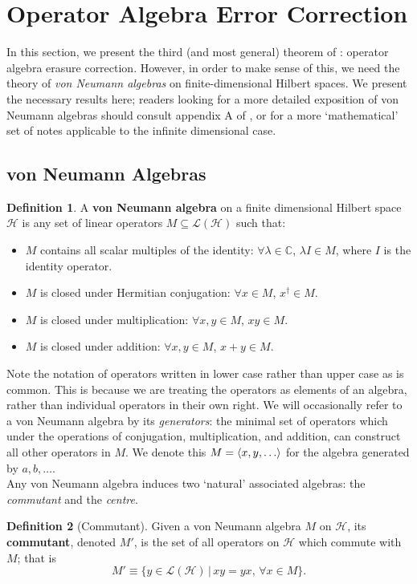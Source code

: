 \documentclass[12pt,a4paper]{report}
\numberwithin{equation}{section}
\theoremstyle{definition}
\newtheorem{definition}{Definition}[section]
\theoremstyle{theorem}
\theoremstyle{theorem}
\theoremstyle{example}
\theoremstyle{definition}
\begin{document}
\section{Operator Algebra Error Correction}
In this section, we present the third (and most general) theorem of \cite{Harlow}: operator algebra erasure correction. However, in order to make sense of this, we need the theory of \textit{von Neumann algebras} on finite-dimensional Hilbert spaces. We present the necessary results here; readers looking for a more detailed exposition of von Neumann algebras should consult appendix A of \cite{Harlow}, or \cite{VNA} for a more `mathematical' set of notes applicable to the infinite dimensional case.
\subsection{von Neumann Algebras}
\begin{definition}
	A \textbf{von Neumann algebra} on a finite dimensional Hilbert space $\mathcal{H}$ is any set of linear operators $M\subseteq\mathcal{L}(\mathcal{H})$ such that:
	\begin{itemize}
		\item $M$ contains all scalar multiples of the identity: $\forall \lambda\in\mathbb{C}$, $\lambda I\in M$, where $I$ is the identity operator.
		\item $M$ is closed under Hermitian conjugation: $\forall x\in M$, $x^{\dagger}\in M$.
		\item $M$ is closed under multiplication: $\forall x,y\in M$, $xy\in M$.
		\item $M$ is closed under addition: $\forall x,y\in M$, $x+y\in M$.
	\end{itemize}
\end{definition}
Note the notation of operators written in lower case rather than upper case as is common. This is because we are treating the operators as elements of an algebra, rather than individual operators in their own right. We will occasionally refer to a von Neumann algebra by its \textit{generators}: the minimal set of operators which under the operations of conjugation, multiplication, and addition, can construct all other operators in $M$. We denote this $M=\braket{x,y,\ldots}$ for the algebra generated by $a,b,\ldots$.\\
Any von Neumann algebra induces two `natural' associated algebras: the \textit{commutant} and the \textit{centre}.
\begin{definition}[Commutant]
	Given a von Neumann algebra $M$ on $\mathcal{H}$, its \textbf{commutant}, denoted $M'$, is the set of all operators on $\mathcal{H}$ which commute with $M$; that is
	\begin{equation}
		M'\equiv\{y\in\mathcal{L}(\mathcal{H})\,|\,xy=yx,\,\forall x\in M\}.
	\end{equation}
\end{definition}
\end{document}
